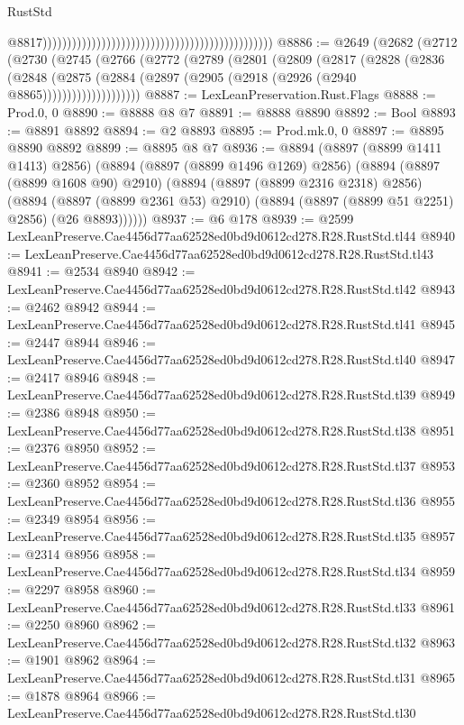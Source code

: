 \begin{lexlean}{RustStd}
\begin{coremodule}
                                                                                                  @8817)))))))))))))))))))))))))))))))))))))))))))))))
@8886 := @2649
    (@2682
      (@2712
        (@2730
          (@2745
            (@2766
              (@2772
                (@2789
                  (@2801
                    (@2809
                      (@2817
                        (@2828
                          (@2836
                            (@2848
                              (@2875
                                (@2884 (@2897 (@2905 (@2918 (@2926 (@2940 @8865))))))))))))))))))))
@8887 := LexLeanPreservation.Rust.Flags
@8888 := Prod.{0, 0}
@8890 := @8888 @8 @7
@8891 := @8888 @8890
@8892 := Bool
@8893 := @8891 @8892
@8894 := @2 @8893
@8895 := Prod.mk.{0, 0}
@8897 := @8895 @8890 @8892
@8899 := @8895 @8 @7
@8936 := @8894
    (@8897 (@8899 @1411 @1413) @2856)
    (@8894
      (@8897 (@8899 @1496 @1269) @2856)
      (@8894
        (@8897 (@8899 @1608 @90) @2910)
        (@8894
          (@8897 (@8899 @2316 @2318) @2856)
          (@8894
            (@8897 (@8899 @2361 @53) @2910)
            (@8894 (@8897 (@8899 @51 @2251) @2856) (@26 @8893))))))
@8937 := @6 @178
@8939 := @2599 LexLeanPreserve.Cae4456d77aa62528ed0bd9d0612cd278.R28.RustStd.tl44
@8940 := LexLeanPreserve.Cae4456d77aa62528ed0bd9d0612cd278.R28.RustStd.tl43
@8941 := @2534 @8940
@8942 := LexLeanPreserve.Cae4456d77aa62528ed0bd9d0612cd278.R28.RustStd.tl42
@8943 := @2462 @8942
@8944 := LexLeanPreserve.Cae4456d77aa62528ed0bd9d0612cd278.R28.RustStd.tl41
@8945 := @2447 @8944
@8946 := LexLeanPreserve.Cae4456d77aa62528ed0bd9d0612cd278.R28.RustStd.tl40
@8947 := @2417 @8946
@8948 := LexLeanPreserve.Cae4456d77aa62528ed0bd9d0612cd278.R28.RustStd.tl39
@8949 := @2386 @8948
@8950 := LexLeanPreserve.Cae4456d77aa62528ed0bd9d0612cd278.R28.RustStd.tl38
@8951 := @2376 @8950
@8952 := LexLeanPreserve.Cae4456d77aa62528ed0bd9d0612cd278.R28.RustStd.tl37
@8953 := @2360 @8952
@8954 := LexLeanPreserve.Cae4456d77aa62528ed0bd9d0612cd278.R28.RustStd.tl36
@8955 := @2349 @8954
@8956 := LexLeanPreserve.Cae4456d77aa62528ed0bd9d0612cd278.R28.RustStd.tl35
@8957 := @2314 @8956
@8958 := LexLeanPreserve.Cae4456d77aa62528ed0bd9d0612cd278.R28.RustStd.tl34
@8959 := @2297 @8958
@8960 := LexLeanPreserve.Cae4456d77aa62528ed0bd9d0612cd278.R28.RustStd.tl33
@8961 := @2250 @8960
@8962 := LexLeanPreserve.Cae4456d77aa62528ed0bd9d0612cd278.R28.RustStd.tl32
@8963 := @1901 @8962
@8964 := LexLeanPreserve.Cae4456d77aa62528ed0bd9d0612cd278.R28.RustStd.tl31
@8965 := @1878 @8964
@8966 := LexLeanPreserve.Cae4456d77aa62528ed0bd9d0612cd278.R28.RustStd.tl30

\end{coremodule}
\end{lexlean}
